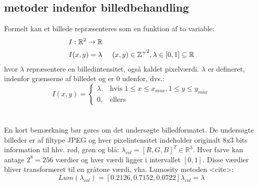 \subsection{metoder indenfor billedbehandling}\label{subsec:kant}
Formelt kan et billede repræsenteres som en funktion af to variable:
\begin{equation}
\begin{split}
&I: \mathbb{R}^2 \rightarrow \mathbb{R} \\
&I(x,y) = \lambda \hspace{0.5 cm} (x,y)\in \mathbb{Z^+}^2, \lambda \in [0,1] \subseteq \mathbb{R}
\end{split}
\end{equation}
hvor $\lambda$ repræsentere en billedintensitet, også kaldet pixelværdi. $\lambda$ er defineret, indenfor grænserne af billedet og er 0 udenfor, dvs.: 
$$ I(x, y) =
\begin{cases}
    \lambda, & \text{hvis } 1 \leq x \leq x_{max}, 1 \leq y \leq y_{max} \\
    0,              & \text{ellers}
\end{cases}
$$
\\
\\
En kort bemærkning bør gøres om det undersøgte billedformatet. De undersøgte billeder er af filtype JPEG og hver pixelintensitet indeholder originalt 8x3 bits information til hhv. rød, grøn og blå: $\lambda_{col} = [R,G,B]^T \in \mathbb{R}^3$. Hver farve kan antage $2^8 = 256$ værdier og hver værdi ligger i intervallet $[0,1]$. Disse værdier bliver transformeret til en gråtone værdi, vha. Lumosity metoden <cite>:
\begin{equation}
Lum(\lambda_{col}) = [0.2126, 0.7152, 0.0722] \lambda_{col} = \lambda
\label{lumosity}
\end{equation}

